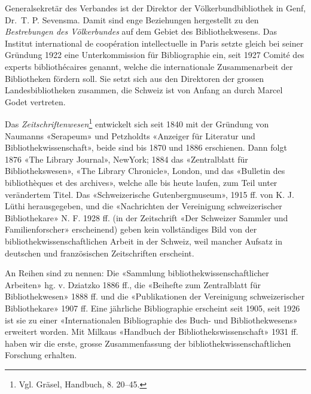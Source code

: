 \documentclass[a4paper,
fontsize=11pt,
oneside,
numbers=noperiodatend,
parskip=half-,
bibliography=totoc,
final
]{scrartcl}
\begin{document}
Generalsekretär des Verbandes ist der Direktor der Völkerbundbibliothek
in Genf, Dr.~T. P. Sevensma. Damit sind enge Beziehungen hergestellt zu
den \emph{Bestrebungen des Völkerbundes} auf dem Gebiet des
Bibliothekwesens. Das Institut international de coopération
intellectuelle in Paris setzte gleich bei seiner Gründung 1922 eine
Unterkommission für Bibliographie ein, seit 1927 Comité des experts
bibliothécaires genannt, welche die internationale Zusammenarbeit der
Bibliotheken fördern soll. Sie setzt sich aus den Direktoren der grossen
Landesbibliotheken zusammen, die Schweiz ist von Anfang an durch Marcel
Godet vertreten.

Das \emph{Zeitschriftenwesen}\footnote{Vgl. Gräsel, Handbuch, 8. 20--45.}
entwickelt sich seit 1840 mit der Gründung von Naumanns «Serapeum» und
Petzholdts «Anzeiger für Literatur und Bibliothekwissenschaft», beide
sind bis 1870 und 1886 erschienen. Dann folgt 1876 «The Library
Journal», NewYork; 1884 das «Zentralblatt für Bibliothekswesen», «The
Library Chronicle», London, und das «Bulletin des bibliothèques et des
archives», welche alle bis heute laufen, zum Teil unter verändertem
Titel. Das «Schweizerische Gutenbergmuseum», 1915 ff. von K. J. Lüthi
herausgegeben, und die «Nachrichten der Vereinigung schweizerischer
Bibliothekare» N. F. 1928 ff. (in der Zeitschrift «Der Schweizer Sammler
und Familienforscher» erscheinend) geben kein vollständiges Bild von der
bibliothekwissenschaftlichen Arbeit in der Schweiz, weil mancher Aufsatz
in deutschen und französischen Zeitschriften erscheint.

An Reihen sind zu nennen: Die «Sammlung bibliothekwissenschaftlicher
Arbeiten» hg. v. Dziatzko 1886 ff., die «Beihefte zum Zentralblatt für
Bibliothekwesen» 1888 ff. und die «Publikationen der Vereinigung
schweizerischer Bibliothekare» 1907 ff. Eine jährliche Bibliographie
erscheint seit 1905, seit 1926 ist sie zu einer «Internationalen
Bibliographie des Buch- und Bibliothekwesens» erweitert worden. Mit
Milkaus «Handbuch der Bibliothekswissenschaft» 1931 ff. haben wir die
erste, grosse Zusammenfassung der bibliothekwissenschaftlichen Forschung
erhalten.
\end{document}
